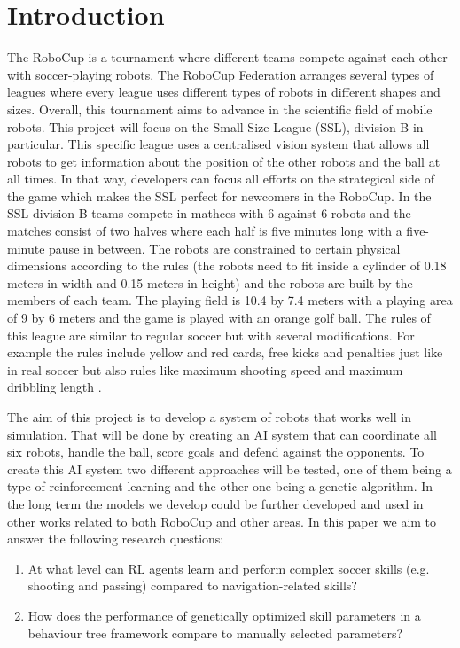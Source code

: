 \section{Introduction}
\label{section:intro}

The RoboCup is a tournament where different teams 
compete against each other with soccer-playing robots. The RoboCup 
Federation arranges several types of leagues where every league uses 
different types of robots in different shapes and sizes. Overall, this 
tournament aims to advance in the scientific field of mobile robots. 
This project will focus on the Small Size League (SSL), division B in 
particular. This specific league uses a centralised vision system that 
allows all robots to get information about the position of the 
other robots and the ball at all times. In that way, developers can focus 
all efforts on the strategical side of the game which makes the SSL 
perfect for newcomers in the RoboCup. In the SSL division B teams 
compete in mathces with 6 against 6 robots and the matches consist of 
two halves where each half is five minutes long with a five-minute pause 
in between. The robots are constrained to certain physical dimensions 
according to the rules (the robots need to fit inside a cylinder of 
0.18 meters in width and 0.15 meters in height) and the robots are built 
by the members of each team. The playing field is 10.4 by 7.4 meters 
with a playing area of 9 by 6 meters and the game is played with an 
orange golf ball. The rules of this league are similar to regular soccer 
but with several modifications. For example the rules include yellow 
and red cards, free kicks and penalties just like in real soccer but 
also rules like maximum shooting speed and maximum dribbling length \cite{RoboCupSSL}. 

The aim of this project is to develop a system of robots that works well in 
simulation. That will be done by creating an AI system that can 
coordinate all six robots, handle the ball, score goals and defend 
against the opponents. To create this AI system two different approaches 
will be tested, one of them being a type of reinforcement learning and the 
other one being a genetic algorithm. In the long term the models we develop could 
be further developed and used in other works related to both RoboCup 
and other areas. In this paper we aim to answer the following research questions:

\vspace{1em}
\begin{enumerate}[label=\arabic*.]
    \item At what level can RL agents learn and perform complex soccer skills 
    (e.g. shooting and passing) compared to navigation-related skills?
    \item How does the performance of genetically optimized skill parameters 
    in a behaviour tree framework compare to manually selected parameters?
\end{enumerate}
